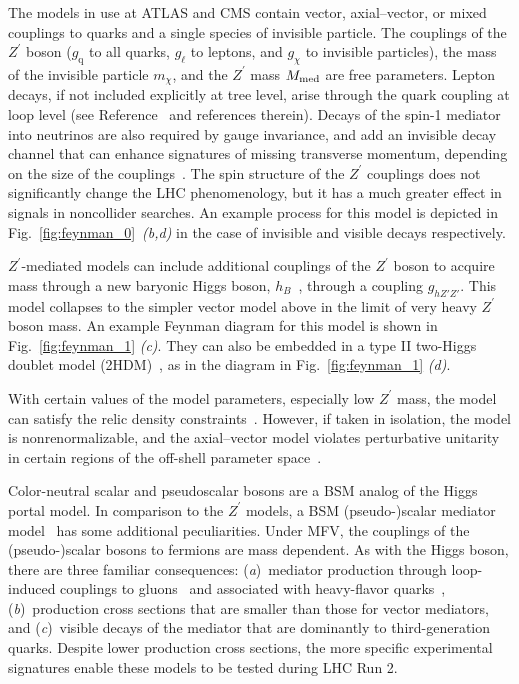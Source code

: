 \documentclass{ar-1col}
\newcommand{\chiDM}{\ensuremath{\chi}\xspace}
\newcommand{\IP}{invisible particle}
\newcommand{\mMed}{\ensuremath{M_{\rm{med}}}\xspace}
\newcommand{\mmed}{\mMed}
\newcommand{\gDM}{\ensuremath{g_{\chiDM}}\xspace}
\newcommand{\gl}{$g_{\ell}$\xspace}
\newcommand{\gq}{$g_{\mathrm{q}}$\xspace}
\newcommand{\mdm}{\ensuremath{m_{\chiDM}}\xspace}
\newcommand{\ghZprimeZprime}{\ensuremath{g_{hZ'Z'}}\xspace}
\newcommand{\Zprime}{\ensuremath{{Z}^\prime}\xspace}
\begin{document}
The models in use at ATLAS and CMS contain vector,
axial--vector, or mixed couplings to quarks and a single species of
{\IP}. The couplings of the \Zprime boson (\gq to all quarks, \gl to
leptons, and \gDM to {\IP}s), the mass of the invisible particle \mdm, and the
\Zprime mass \mmed are free parameters. Lepton decays, if not
included explicitly at tree level, arise through the quark
coupling at loop level (see Reference~ and
references therein). Decays of the spin-1 mediator into neutrinos
are also required by gauge invariance, and add an invisible decay
channel that can enhance signatures of missing transverse
momentum, depending on the size of the
couplings~\cite{Albert:2017onk}. The spin structure of the \Zprime
couplings does not significantly change the LHC phenomenology, but it
has a much greater effect in signals in noncollider searches.
An example process for this model is depicted in Fig.~\ref{fig:feynman_0}~\textit{(b,d)} in
the case of invisible and visible decays respectively.

\Zprime-mediated models can include additional couplings of the
\Zprime boson to acquire mass through a new baryonic Higgs boson,
$h_B$~\cite{Berlin:2014cfa}, through a coupling \ghZprimeZprime. 
This model collapses to the simpler vector model
above in the limit of very heavy \Zprime boson mass. 
An example Feynman diagram for this model is shown
in Fig.~\ref{fig:feynman_1} \textit{(c)}. 
They can also be
embedded in a type II two-Higgs doublet model
(2HDM)~\cite{Berlin:2014cfa}, as in the diagram in Fig.~\ref{fig:feynman_1} \textit{(d)}.

With certain values of the model parameters, especially low
\Zprime mass, the model can satisfy the relic density
constraints~\cite{Chala:2015ama}. However, if taken in isolation,
the model is nonrenormalizable, and the axial--vector model
violates perturbative unitarity in certain regions of the
off-shell parameter
space~\cite{Chala:2015ama,Kahlhoefer:2015bea,Boveia:2016mrp}.

{Color-neutral scalar and pseudoscalar bosons} are a BSM
analog of the Higgs portal model. In comparison to the \Zprime
models, a BSM (pseudo-)scalar mediator
model~\cite{Buckley:2014fba} has some additional peculiarities.
Under MFV, the couplings of the (pseudo-)scalar bosons to fermions
are mass dependent. As with the Higgs boson, there are three
familiar consequences: (\textit{a})\ mediator production through loop-induced
couplings to gluons~\cite{Haisch:2015ioa} and associated with
heavy-flavor quarks~\cite{Buckley:2014fba}, (\textit{b})\ production
cross sections that are smaller than those for vector mediators, and (\textit{c})\ visible
decays of the mediator that are dominantly to third-generation quarks.
Despite lower production cross sections, the more specific
experimental signatures enable these models to be tested during
LHC Run 2.
\end{document}
